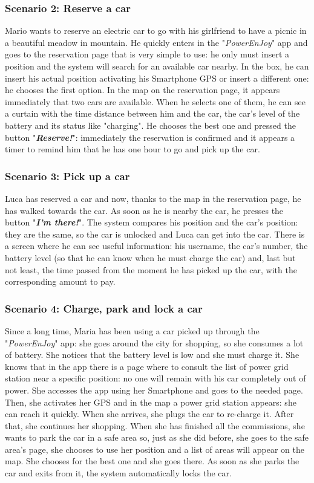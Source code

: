 \subsubsection{Scenario 2: Reserve a car} \label{sce2}
Mario wants to reserve an electric car to go with his girlfriend to have a picnic in a beautiful meadow in mountain. He quickly enters in the "\textit{PowerEnJoy}" app and goes to the reservation page that is very simple to use: he only must insert a position and the system will search for an available car nearby. In the box, he can insert his actual position activating his Smartphone GPS or insert a different one: he chooses the first option. In the map on the reservation page, it appears immediately that two cars are available. When he selects one of them, he can see a curtain with the time distance between him and the car, the car's level of the battery and its status like "charging". He chooses the best one and pressed the button "\textbf{\textit{Reserve!}}": immediately the reservation is confirmed and it appears a timer to remind him that he has one hour to go and pick up the car.
\subsubsection{Scenario 3: Pick up a car} \label{sce3}
Luca has reserved a car and now, thanks to the map in the reservation page, he has walked towards the car. As soon as he is nearby the car, he presses the button "\textbf{\textit{I'm there!}}". The system compares his position and the car's position: they are the same, so the car is unlocked and Luca can get into the car. There is a screen where he can see useful information: his username, the car's number, the battery level (so that he can know when he must charge the car) and, last but not least, the time passed from the moment he has picked up the car, with the corresponding amount to pay.
\subsubsection{Scenario 4: Charge, park and lock a car} \label{sce4}
Since a long time, Maria has been using a car picked up through the "\textit{PowerEnJoy}" app: she goes around the city for shopping, so she consumes a lot of battery. She notices that the battery level is low and she must charge it. She knows that in the app there is a page where to consult the list of power grid station near a specific position: no one will remain with his car completely out of power. She accesses the app using her Smartphone and goes to the needed page. Then, she activates her GPS and in the map a power grid station appears: she can reach it quickly. When she arrives, she plugs the car to re-charge it. After that, she continues her shopping. When she has finished all the commissions, she wants to park the car in a safe area so, just as she did before, she goes to the safe area's page, she chooses to use her position and a list of areas will appear on the map. She chooses for the best one and she goes there. As soon as she parks the car and exits from it, the system automatically locks the car.  
